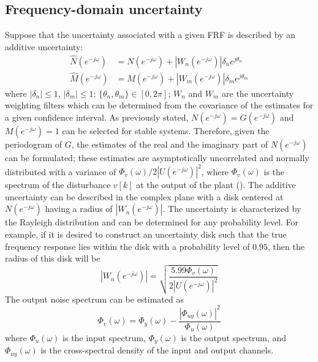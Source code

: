 \documentclass[journal]{IEEEtran}
\newcommand{\jo}{(e^{-j\omega})}
\begin{document}
\subsection{Frequency-domain uncertainty} \label{sec:freq_uncertain}
Suppose that the uncertainty associated with a given FRF is described by an additive uncertainty:
\begin{equation}
\begin{aligned} \label{eq:frf_uncertainty}
\hat{N}(e^{-j\omega}) &= N(e^{-j\omega}) + |W_n(e^{-j\omega})| \delta_n e^{j\theta_n} \\
\hat{M}(e^{-j\omega}) &= M(e^{-j\omega}) + |W_m(e^{-j\omega})| \delta_m e^{j\theta_m}
\end{aligned}
\end{equation}
where $|\delta_n| \leq 1$, $|\delta_m| \leq 1$; $\{ \theta_n,\theta_m\} \in [0,2\pi]$; $W_n$ and $W_m$ are the uncertainty weighting filters which can be determined from the covariance of the estimates for a given confidence interval.  As previously stated, $N\jo = G\jo$ and $M\jo = 1$ can be selected for stable systems. Therefore, given the periodogram of $G$, the estimates of the real and the imaginary part of $N\jo$ can be formulated; these estimates are asymptotically uncorrelated and normally distributed with a variance of $\Phi_v(\omega)/2|U\jo|^2$, where $\Phi_v(\omega)$ is the spectrum of the disturbance $v[k]$ at the output of the plant (\cite{Lju99}). The additive uncertainty can be described in the complex plane with a disk centered at $N\jo$ having a radius of $|W_n\jo|$. The uncertainty is characterized by the Rayleigh distribution and can be determined for any probability level. For example, if it is desired to construct an uncertainty disk such that the true frequency response lies within the disk with a probability level of $0.95$, then the radius of this disk will be
\begin{equation} \label{eq:uncertainty_radius}
|W_n\jo| = \sqrt{\frac{5.99 \Phi_v(\omega)}{2|U\jo|^2}}
\end{equation}
The output noise spectrum can be estimated as
\begin{equation} \label{eq:noise_spectrum}
\Phi_v(\omega) = \Phi_y(\omega) - \frac{|\Phi_{uy}(\omega)|^2}{\Phi_u(\omega)}
\end{equation}
where $\Phi_u(\omega)$ is the input spectrum, $\Phi_y(\omega)$ is the output spectrum, and $\Phi_{uy}(\omega)$ is the cross-spectral density of the input and output channels. 
\end{document}
